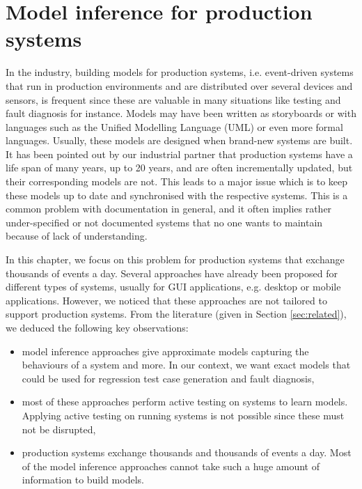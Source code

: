 %
\chapter{Model inference for production systems}
\label{sec:modelinf:prodsystems}

In the industry, building models for production systems, i.e.
event-driven systems that run in production environments and are
distributed over several devices and sensors, is frequent since
these are valuable in many situations like testing and fault
diagnosis for instance. Models may have been written as
storyboards or with languages such as the Unified Modelling
Language (UML) or even more formal languages. Usually, these
models are designed when brand-new systems are built. It has been
pointed out by our industrial partner that production systems
have a life span of many years, up to 20 years, and are often
incrementally updated, but their corresponding models are not.
This leads to a major issue which is to keep these models up to
date and synchronised with the respective systems. This is a
common problem with documentation in general, and it often
implies rather under-specified or not documented systems that no
one wants to maintain because of lack of understanding.

In this chapter, we focus on this problem for production systems
that exchange thousands of events a day. Several approaches have
already been proposed for different types of systems, usually for
GUI applications, e.g. desktop or mobile applications. However,
we noticed that these approaches are not tailored to support
production systems. From the literature (given in Section
\ref{sec:related}), we deduced the following key observations:

\begin{itemize}
    \item model inference approaches give approximate models
    capturing the behaviours of a system and more. In our
    context, we want exact models that could be used for
    regression test case generation and fault diagnosis,

    \item most of these approaches perform active testing on
    systems to learn models. Applying active testing on running
    systems is not possible since these must not be disrupted,

    \item production systems exchange thousands and thousands of
    events a day. Most of the model inference approaches cannot
    take such a huge amount of information to build models.
\end{itemize}

